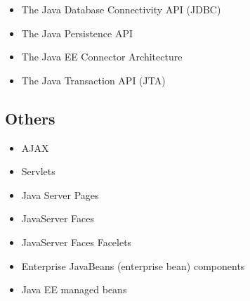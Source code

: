 \begin{itemize}
	\item The Java Database Connectivity API (JDBC)
\end{itemize}

\begin{itemize}
	\item The Java Persistence API
\end{itemize}

\begin{itemize}
	\item The Java EE Connector Architecture
\end{itemize}

\begin{itemize}
	\item The Java Transaction API (JTA)
\end{itemize}


\subsection{Others}
\begin{itemize}
	\item AJAX
\end{itemize}

\begin{itemize}
	\item Servlets
\end{itemize}

\begin{itemize}
	\item Java Server Pages
\end{itemize}


\begin{itemize}
	\item JavaServer Faces
\end{itemize}

\begin{itemize}
	\item JavaServer Faces Facelets
\end{itemize}

\begin{itemize}
	\item Enterprise JavaBeans (enterprise bean) components
\end{itemize}

\begin{itemize}
	\item Java EE managed beans
\end{itemize}



